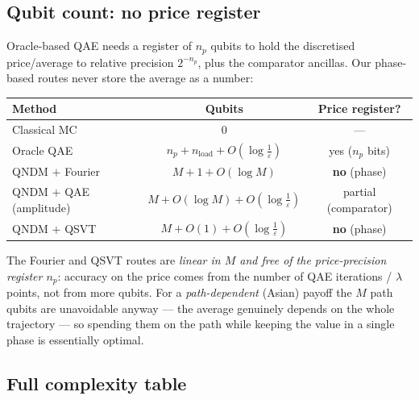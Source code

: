 \documentclass{article}
\begin{document}
\subsection{Qubit count: no price register}

Oracle-based QAE needs a register of $n_p$ qubits to hold the discretised price/average to relative precision $2^{-n_p}$, plus the comparator ancillas. Our phase-based routes never store the average as a number:
\begin{center}
\renewcommand{\arraystretch}{1.3}
\begin{tabular}{|l|c|c|}
\hline
\textbf{Method} & \textbf{Qubits} & \textbf{Price register?} \\
\hline
Classical MC & $0$ & --- \\
Oracle QAE \cite{Stamatopoulos_2020} & $n_p + n_{\text{load}} + O(\log\tfrac1\varepsilon)$ & yes ($n_p$ bits) \\
QNDM $+$ Fourier & $M + 1 + O(\log M)$ & \textbf{no} (phase) \\
QNDM $+$ QAE (amplitude) & $M + O(\log M) + O(\log\tfrac1\varepsilon)$ & partial (comparator) \\
QNDM $+$ QSVT & $M + O(1) + O(\log\tfrac1\varepsilon)$ & \textbf{no} (phase) \\
\hline
\end{tabular}
\end{center}
The Fourier and QSVT routes are \emph{linear in $M$ and free of the price-precision register $n_p$}: accuracy on the price comes from the number of QAE iterations / $\lambda$ points, not from more qubits. For a \emph{path-dependent} (Asian) payoff the $M$ path qubits are unavoidable anyway --- the average genuinely depends on the whole trajectory --- so spending them on the path while keeping the value in a single phase is essentially optimal.

\subsection{Full complexity table}
\end{document}
